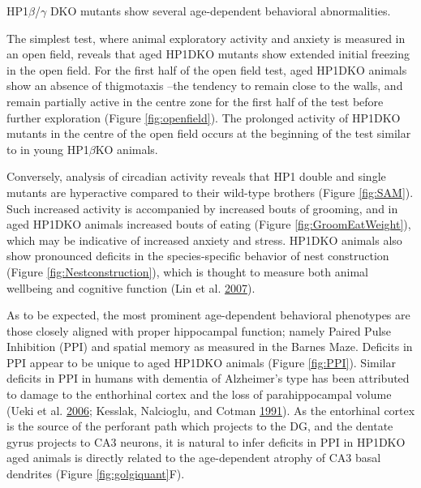 \documentclass[onehalf,12pt]{beavtex}
\begin{document}
  HP1\(\beta\)/\(\gamma\) DKO mutants show several age-dependent
  behavioral abnormalities.
  
  The simplest test, where animal exploratory activity and anxiety is
  measured in an open field, reveals that aged HP1DKO mutants show
  extended initial freezing in the open field. For the first half of the
  open field test, aged HP1DKO animals show an absence of thigmotaxis
  --the tendency to remain close to the walls, and remain partially active
  in the centre zone for the first half of the test before further
  exploration (Figure \ref{fig:openfield}). The prolonged activity of
  HP1DKO mutants in the centre of the open field occurs at the beginning
  of the test similar to in young HP1\(\beta\)KO animals.
  
  Conversely, analysis of circadian activity reveals that HP1 double and
  single mutants are hyperactive compared to their wild-type brothers
  (Figure \ref{fig:SAM}). Such increased activity is accompanied by
  increased bouts of grooming, and in aged HP1DKO animals increased bouts
  of eating (Figure \ref{fig:GroomEatWeight}), which may be indicative of
  increased anxiety and stress. HP1DKO animals also show pronounced
  deficits in the species-specific behavior of nest construction (Figure
  \ref{fig:Nestconstruction}), which is thought to measure both animal
  wellbeing and cognitive function (Lin et al.
  \protect\hyperlink{ref-LinNeuralencodingconcept2007}{2007}).
  
  As to be expected, the most prominent age-dependent behavioral
  phenotypes are those closely aligned with proper hippocampal function;
  namely Paired Pulse Inhibition (PPI) and spatial memory as measured in
  the Barnes Maze. Deficits in PPI appear to be unique to aged HP1DKO
  animals (Figure \ref{fig:PPI}). Similar deficits in PPI in humans with
  dementia of Alzheimer's type has been attributed to damage to the
  enthorhinal cortex and the loss of parahippocampal volume (Ueki et al.
  \protect\hyperlink{ref-UekiPrepulseinhibitionacoustic2006}{2006};
  Kesslak, Nalcioglu, and Cotman
  \protect\hyperlink{ref-KesslakQuantificationmagneticresonance1991}{1991}).
  As the entorhinal cortex is the source of the perforant path which
  projects to the DG, and the dentate gyrus projects to CA3 neurons, it is
  natural to infer deficits in PPI in HP1DKO aged animals is directly
  related to the age-dependent atrophy of CA3 basal dendrites (Figure
  \ref{fig:golgiquant}F).
  
\end{document}
